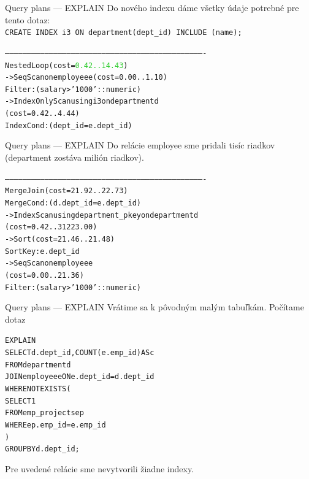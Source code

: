 \documentclass[12pt]{beamer}
\def\green#1{\textcolor{LimeGreen}{#1}}
\begin{document}
\begin{frame}[fragile]{Query plans --- EXPLAIN}
Do nového indexu dáme všetky údaje potrebné pre tento dotaz:\\[3mm]
{\small\texttt{CREATE INDEX i3 ON department(dept\_id) \alert{INCLUDE (name)};}}
\scriptsize
\begin{alltt}
----------------------------------------------------------------------------------------------------------------------------------------
Nested Loop  (cost=\green{0.42..14.43})
  ->  Seq Scan on employee e  (cost=0.00..1.10)
        Filter: (salary > '1000'::numeric)
  ->  \alert{Index Only Scan using i3 on department d}
      (cost=0.42..4.44)
        Index Cond: (dept_id = e.dept_id)
\end{alltt}
\end{frame}

\begin{frame}[fragile]{Query plans --- EXPLAIN}
Do relácie employee sme pridali tisíc riadkov (department zostáva milión riadkov).
\scriptsize
\begin{alltt}
----------------------------------------------------------------------------------------------------------------------------------------
\alert{Merge Join}  (cost=21.92..22.73)
Merge Cond: (d.dept_id = e.dept_id)
  ->  Index Scan using department_pkey on department d
      (cost=0.42..31223.00)
  ->  Sort  (cost=21.46..21.48)
        Sort Key: e.dept_id
        ->  Seq Scan on employee e
            (cost=0.00..21.36)
              Filter: (salary > '1000'::numeric)
\end{alltt}
\end{frame}

\begin{frame}[fragile]{Query plans --- EXPLAIN}
Vrátime sa k pôvodným malým tabuľkám. Počítame dotaz
\begin{alltt}
\alert{EXPLAIN}
SELECT d.dept_id, COUNT(e.emp_id) AS c
FROM department d
JOIN employee e ON e.dept_id = d.dept_id
WHERE NOT EXISTS (
    SELECT 1
    FROM emp_projects ep
    WHERE ep.emp_id = e.emp_id
)
GROUP BY d.dept_id;
\end{alltt}
Pre uvedené relácie sme nevytvorili žiadne indexy.
\end{frame}
\end{document}
